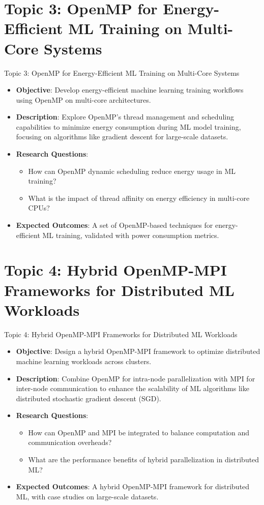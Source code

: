 \documentclass[compress]{beamer}
\begin{document}
\section{Topic 3: OpenMP for Energy-Efficient ML Training on Multi-Core Systems}
\begin{frame}{Topic 3: OpenMP for Energy-Efficient ML Training on Multi-Core Systems}
    \begin{itemize}
        \item \textbf{Objective}: Develop energy-efficient machine learning training workflows using OpenMP on multi-core architectures.
        \item \textbf{Description}: Explore OpenMP’s thread management and scheduling capabilities to minimize energy consumption during ML model training, focusing on algorithms like gradient descent for large-scale datasets.
        \item \textbf{Research Questions}:
        \begin{itemize}
            \item How can OpenMP dynamic scheduling reduce energy usage in ML training?
            \item What is the impact of thread affinity on energy efficiency in multi-core CPUs?
        \end{itemize}
        \item \textbf{Expected Outcomes}: A set of OpenMP-based techniques for energy-efficient ML training, validated with power consumption metrics.
    \end{itemize}
\end{frame}

\section{Topic 4: Hybrid OpenMP-MPI Frameworks for Distributed ML Workloads}
\begin{frame}{Topic 4: Hybrid OpenMP-MPI Frameworks for Distributed ML Workloads}
    \begin{itemize}
        \item \textbf{Objective}: Design a hybrid OpenMP-MPI framework to optimize distributed machine learning workloads across clusters.
        \item \textbf{Description}: Combine OpenMP for intra-node parallelization with MPI for inter-node communication to enhance the scalability of ML algorithms like distributed stochastic gradient descent (SGD).
        \item \textbf{Research Questions}:
        \begin{itemize}
            \item How can OpenMP and MPI be integrated to balance computation and communication overheads?
            \item What are the performance benefits of hybrid parallelization in distributed ML?
        \end{itemize}
        \item \textbf{Expected Outcomes}: A hybrid OpenMP-MPI framework for distributed ML, with case studies on large-scale datasets.
    \end{itemize}
\end{frame}
\end{document}
